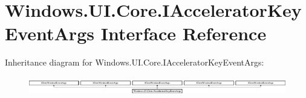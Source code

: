 \hypertarget{interface_windows_1_1_u_i_1_1_core_1_1_i_accelerator_key_event_args}{}\section{Windows.\+U\+I.\+Core.\+I\+Accelerator\+Key\+Event\+Args Interface Reference}
\label{interface_windows_1_1_u_i_1_1_core_1_1_i_accelerator_key_event_args}
Inheritance diagram for Windows.\+U\+I.\+Core.\+I\+Accelerator\+Key\+Event\+Args\+:\begin{figure}[H]
\begin{center}
\leavevmode
\includegraphics[height=0.823529cm]{interface_windows_1_1_u_i_1_1_core_1_1_i_accelerator_key_event_args}
\end{center}
\end{figure}
